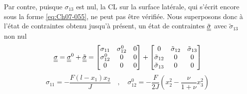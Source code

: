 Par contre, puisque $\sigma_{13}$ est nul, la CL sur la surface latérale, qui s'écrit encore sous la forme \eqref{eq:Ch07-055}, ne peut pas être vérifiée.
Nous superposons donc à l'état de contraintes obtenu jusqu'à présent, un état de contraintes $\tilde{\underline{\underline{\sigma}}}$ avec $\tilde{\sigma}_{13}$ non nul
\begin{equation}
    \underline{\underline{\sigma}} = \underline{\underline{\sigma}}^0 + \tilde{\underline{\underline{\sigma}}} = 
    \begin{bmatrix}
        \sigma_{11} & \sigma_{12}^0 & 0 \\
        \sigma_{12}^0 & 0 & 0 \\
        0 & 0 & 0
    \end{bmatrix}
    +
    \begin{bmatrix}
        0 & \tilde{\sigma}_{12} & \tilde{\sigma}_{13} \\
        \tilde{\sigma}_{12} & 0 & 0 \\
        \tilde{\sigma}_{13} & 0 & 0
    \end{bmatrix}
    \label{eq:Ch07-100}
\end{equation}
\begin{equation}
    \sigma_{11} = -\frac{F(l-x_1)x_2}{J} \quad,\quad \sigma_{12}^0 = -\frac{F}{2J} \left( x_2^2 - \frac{\nu}{1+\nu}x_3^2 \right)
    \label{eq:Ch07-101}
\end{equation}

